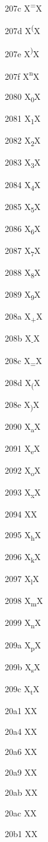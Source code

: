 \documentclass[11pt]{article}
\begin{document}
207c X{\textsuperscript{=}}X

207d X{\textsuperscript{(}}X

207e X{\textsuperscript{)}}X

207f X{\textsuperscript{n}}X

2080 X{\textsubscript{0}}X

2081 X{\textsubscript{1}}X

2082 X{\textsubscript{2}}X

2083 X{\textsubscript{3}}X

2084 X{\textsubscript{4}}X

2085 X{\textsubscript{5}}X

2086 X{\textsubscript{6}}X

2087 X{\textsubscript{7}}X

2088 X{\textsubscript{8}}X

2089 X{\textsubscript{9}}X

208a X{\textsubscript{+}}X

208b X{\textsubscript{-}}X

208c X{\textsubscript{=}}X

208d X{\textsubscript{(}}X

208e X{\textsubscript{)}}X

2090 X{\textsubscript{a}}X

2091 X{\textsubscript{e}}X

2092 X{\textsubscript{o}}X

2093 X{\textsubscript{x}}X

2094 X{\textsubscript{\textschwa}}X

2095 X{\textsubscript{h}}X

2096 X{\textsubscript{k}}X

2097 X{\textsubscript{l}}X

2098 X{\textsubscript{m}}X

2099 X{\textsubscript{n}}X

209a X{\textsubscript{p}}X

209b X{\textsubscript{s}}X

209c X{\textsubscript{t}}X

20a1 X{\textcolonmonetary}X

20a4 X{\textlira}X

20a6 X{\textnaira}X

20a9 X{\textwon}X

20ab X{\textdong}X

20ac X{\texteuro}X

20b1 X{\textpeso}X
\end{document}
